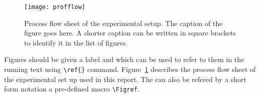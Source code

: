 \begin{figure}[tbp]
  \centering
    \texttt{[image: profflow]}
    \caption[Process flow sheet]{Process flow sheet of the
      experimental setup. The caption of the figure goes here. A
      shorter caption can be written in square brackets to identify it
      in the list of figures.}
    \label{fig:pfs} 
\end{figure}

Figures should be given a label and which can be used to refer to them
in the running text using \verb|\ref{}| command. Figure~\ref{fig:pfs}
describes the process flow sheet of the experimental set up used in
this report. The  can also be refered by a short form notation
a pre-defined macro \verb"\Figref".



